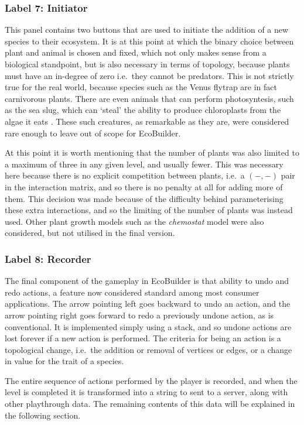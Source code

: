 \subsubsection{Label 7: Initiator}
This panel contains two buttons that are used to initiate the addition of a new species to their ecosystem.
It is at this point at which the binary choice between plant and animal is chosen and fixed, which not only makes sense from a biological standpoint, but is also necessary in terms of topology, because plants must have an in-degree of zero i.e.\ they cannot be predators. This is not strictly true for the real world, because species such as the Venus flytrap are in fact carnivorous plants. There are even animals that can perform photosyntesis, such as the sea slug, which can `steal' the ability to produce chloroplasts from the algae it eats \cite{Rumpho2008}.
These such creatures, as remarkable as they are, were considered rare enough to leave out of scope for EcoBuilder.

At this point it is worth mentioning that the number of plants was also limited to a maximum of three in any given level, and usually fewer. This was necessary here because there is no explicit competition between plants, i.e.\ a $(-,-)$ pair in the interaction matrix, and so there is no penalty at all for adding more of them.
This decision was made because of the difficulty behind parameterising these extra interactions, and so the limiting of the number of plants was instead used. Other plant growth models such as the \emph{chemostat} model \cite{Sommer1983} were also considered, but not utilised in the final version.

\subsubsection{Label 8: Recorder}
The final component of the gameplay in EcoBuilder is that ability to undo and redo actions, a feature now considered standard among most consumer applications. The arrow pointing left goes backward to undo an action, and the arrow pointing right goes forward to redo a previously undone action, as is conventional. It is implemented simply using a stack, and so undone actions are lost forever if a new action is performed.
The criteria for being an action is a topological change, i.e.\ the addition or removal of vertices or edges, or a change in value for the trait of a species.

The entire sequence of actions performed by the player is recorded, and when the level is completed it is transformed into a string to sent to a server, along with other playthrough data. The remaining contents of this data will be explained in the following section.

